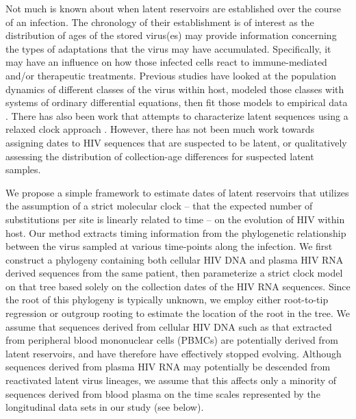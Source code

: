 Not much is known about when latent reservoirs are established over the course of an infection. 
The chronology of their establishment is of interest as the distribution of ages of the stored virus(es) may provide information concerning the types of adaptations that the virus may have accumulated. 
Specifically, it may have an influence on how those infected cells react to immune-mediated and/or therapeutic treatments. 
Previous studies have looked at the population dynamics of different classes of the virus within host, modeled those classes with systems of ordinary differential equations, then fit those models to empirical data \citep{Althaus14}. 
There has also been work that attempts to characterize latent sequences using a relaxed clock approach \citep{Immonen14}. 
However, there has not been much work towards assigning dates to HIV sequences that are suspected to be latent, or qualitatively assessing the distribution of collection-age differences for suspected latent samples.

We propose a simple framework to estimate dates of latent reservoirs that utilizes the assumption of a strict molecular clock -- that the expected number of substitutions per site is linearly related to time \citep{Ho14} --  on the evolution of HIV within host. 
Our method extracts timing information from the phylogenetic relationship between the virus sampled at various time-points along the infection. 
We first construct a phylogeny containing both cellular HIV DNA and plasma HIV RNA derived sequences from the same patient, then parameterize a strict clock model on that tree based solely on the collection dates of the HIV RNA sequences. 
Since the root of this phylogeny is typically unknown, we employ either root-to-tip regression \citep{Korber00} or outgroup rooting to estimate the location of the root in the tree. 
We assume that sequences derived from cellular HIV DNA such as that extracted from peripheral blood mononuclear cells (PBMCs) are potentially derived from latent reservoirs, and have therefore have effectively stopped evolving.
Although sequences derived from plasma HIV RNA may potentially be descended from reactivated latent virus lineages, we assume that this affects only a minority of sequences derived from blood plasma on the time scales represented by the longitudinal data sets in our study (see below).

